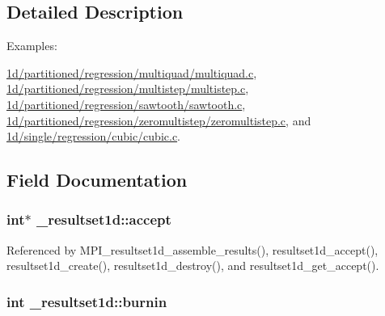 \subsection{Detailed Description}
\begin{Desc}
\item[Examples\+: ]\par
\hyperlink{1d_2partitioned_2regression_2multiquad_2multiquad_8c-example}{1d/partitioned/regression/multiquad/multiquad.\+c}, \hyperlink{1d_2partitioned_2regression_2multistep_2multistep_8c-example}{1d/partitioned/regression/multistep/multistep.\+c}, \hyperlink{1d_2partitioned_2regression_2sawtooth_2sawtooth_8c-example}{1d/partitioned/regression/sawtooth/sawtooth.\+c}, \hyperlink{1d_2partitioned_2regression_2zeromultistep_2zeromultistep_8c-example}{1d/partitioned/regression/zeromultistep/zeromultistep.\+c}, and \hyperlink{1d_2single_2regression_2cubic_2cubic_8c-example}{1d/single/regression/cubic/cubic.\+c}.\end{Desc}


\subsection{Field Documentation}
\subsubsection[{\texorpdfstring{accept}{accept}}]{\setlength{\rightskip}{0pt plus 5cm}int$\ast$ \+\_\+resultset1d\+::accept}\hypertarget{struct__resultset1d_acf68e2b4148ba3b2b1bf55f1a19ccb0d}{}\label{struct__resultset1d_acf68e2b4148ba3b2b1bf55f1a19ccb0d}


Referenced by M\+P\+I\+\_\+resultset1d\+\_\+assemble\+\_\+results(), resultset1d\+\_\+accept(), resultset1d\+\_\+create(), resultset1d\+\_\+destroy(), and resultset1d\+\_\+get\+\_\+accept().

\subsubsection[{\texorpdfstring{burnin}{burnin}}]{\setlength{\rightskip}{0pt plus 5cm}int \+\_\+resultset1d\+::burnin}\hypertarget{struct__resultset1d_a04dbefde6d377a2a0d0238a8b5bafee4}{}\label{struct__resultset1d_a04dbefde6d377a2a0d0238a8b5bafee4}


